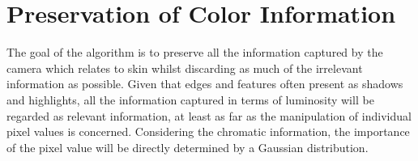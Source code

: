 %

\section{Preservation of Color Information}\label{sec:PreservationOfColorInformation}

The goal of the algorithm is to preserve all the information captured by the camera which relates to skin whilst discarding as much of the irrelevant information as possible. Given that edges and features often present as shadows and highlights, all the information captured in terms of luminosity will be regarded as relevant information, at least as far as the manipulation of individual pixel values is concerned. Considering the chromatic information, the importance of the pixel value will be directly determined by a Gaussian distribution.

